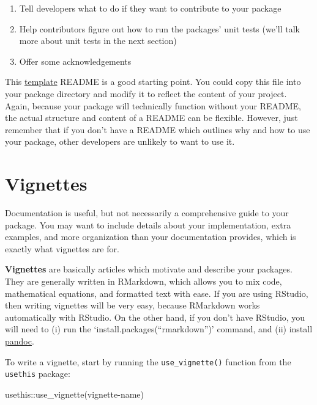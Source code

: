 \documentclass[
]{book}
\newenvironment{Shaded}{\begin{snugshade}}{\end{snugshade}}
\newcommand{\FunctionTok}[1]{\textcolor[rgb]{0.00,0.00,0.00}{#1}}
\newcommand{\NormalTok}[1]{#1}
\newcommand{\SpecialCharTok}[1]{\textcolor[rgb]{0.00,0.00,0.00}{#1}}
\newcommand{\StringTok}[1]{\textcolor[rgb]{0.31,0.60,0.02}{#1}}
\providecommand{\tightlist}{%
  \setlength{\itemsep}{0pt}\setlength{\parskip}{0pt}}
\begin{document}
\begin{enumerate}
\def\labelenumi{\arabic{enumi}.}
\setcounter{enumi}{2}
\tightlist
\item
  Tell developers what to do if they want to contribute to your package
\item
  Help contributors figure out how to run the packages' unit tests (we'll talk more about unit tests in the next section)
\item
  Offer some acknowledgements
\end{enumerate}

This \href{https://gist.github.com/PurpleBooth/109311bb0361f32d87a2}{template} README is a good starting point. You could copy this file into your package directory and modify it to reflect the content of your project. Again, because your package will technically function without your README, the actual structure and content of a README can be flexible. However, just remember that if you don't have a README which outlines why and how to use your package, other developers are unlikely to want to use it.

\hypertarget{vignettes}{%
\section{Vignettes}\label{vignettes}}

Documentation is useful, but not necessarily a comprehensive guide to your package. You may want to include details about your implementation, extra examples, and more organization than your documentation provides, which is exactly what vignettes are for.

\textbf{Vignettes} are basically articles which motivate and describe your packages. They are generally written in RMarkdown, which allows you to mix code, mathematical equations, and formatted text with ease. If you are using RStudio, then writing vignettes will be very easy, because RMarkdown works automatically with RStudio. On the other hand, if you don't have RStudio, you will need to (i) run the `install.packages(``rmarkdown'')' command, and (ii) install \href{http://pandoc.org/installing.html}{pandoc}.

To write a vignette, start by running the \texttt{use\_vignette()} function from the \texttt{usethis} package:

\begin{Shaded}
\begin{Highlighting}[]
\NormalTok{usethis}\SpecialCharTok{::}\FunctionTok{use\_vignette}\NormalTok{(}\StringTok{\textquotesingle{}vignette{-}name\textquotesingle{}}\NormalTok{)}
\end{Highlighting}
\end{Shaded}
\end{document}
